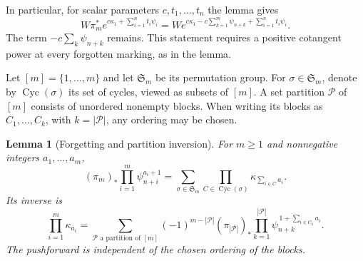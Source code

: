 \documentclass[a4paper,10pt]{article}
\numberwithin{equation}{section}
\theoremstyle{paperplain}
\newtheorem{lmm}[thm]{Lemma}
\theoremstyle{paperremark}
\theoremstyle{paperplain}
\begin{document}
In particular, for scalar parameters $c,t_1,\ldots,t_n$ the lemma gives
\begin{equation}
\label{eq:s02:tail-exponential}
W\pi_m^*e^{c\kappa_1+\sum_{i=1}^nt_i\psi_i}
=W e^{c\kappa_1-c\sum_{k=1}^m\psi_{n+k}+\sum_{i=1}^nt_i\psi_i}.
\end{equation}
The term $-c\sum_k\psi_{n+k}$ remains.  This statement requires a
positive cotangent power at every forgotten marking, as in the lemma.

Let $[m]=\{1,\ldots,m\}$ and let $\mathfrak S_m$ be its permutation
group.  For $\sigma\in\mathfrak S_m$, denote by
$\operatorname{Cyc}(\sigma)$ its set of cycles, viewed as subsets of
$[m]$.  A set partition $\mathcal P$ of $[m]$ consists of unordered
nonempty blocks.  When writing its blocks as $C_1,\ldots,C_k$, with
$k=|\mathcal P|$, any ordering may be chosen.

\begin{lmm}[Forgetting and partition inversion]
\label{lmm:s02:forgetting-inversion}
For $m\geq1$ and nonnegative integers $a_1,\ldots,a_m$,
\begin{equation}
\label{eq:s02:forgetting-permutations}
(\pi_m)_*\prod_{i=1}^m\psi_{n+i}^{a_i+1}
=\sum_{\sigma\in\mathfrak S_m}
\prod_{C\in\operatorname{Cyc}(\sigma)}\kappa_{\sum_{i\in C}a_i}.
\end{equation}
Its inverse is
\begin{equation}
\label{eq:s02:partition-inversion}
\prod_{i=1}^m\kappa_{a_i}
=\sum_{\mathcal P\text{ a partition of }[m]}
(-1)^{m-|\mathcal P|}(\pi_{|\mathcal P|})_*
\prod_{k=1}^{|\mathcal P|}
\psi_{n+k}^{\,1+\sum_{i\in C_k}a_i}.
\end{equation}
The pushforward is independent of the chosen ordering of the blocks.
\end{lmm}
\end{document}
